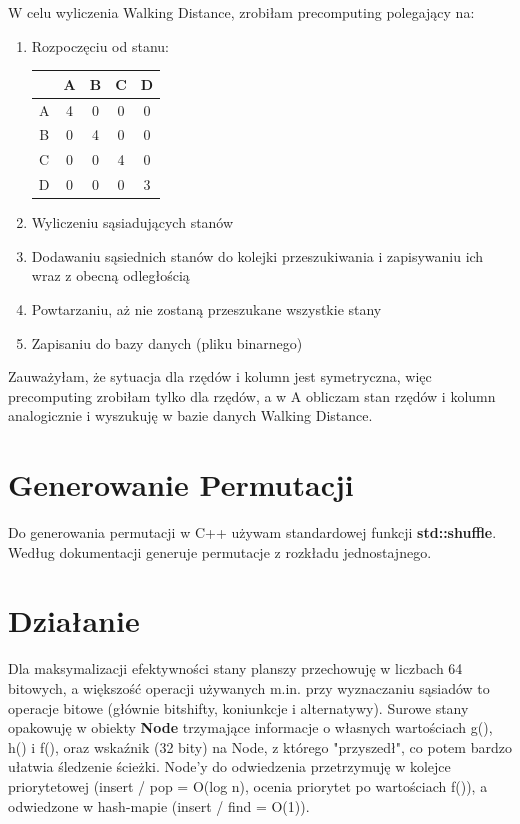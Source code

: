 \documentclass[12pt]{article}
\begin{document}
W celu wyliczenia Walking Distance, zrobiłam precomputing polegający na:
\begin{enumerate}
    \item Rozpoczęciu od stanu:
        \begin{tabular}{|c|c|c|c|c|}
        \hline
         & A & B & C & D \\
        \hline
        A & 4 & 0 & 0 & 0 \\
        \hline
        B & 0 & 4 & 0 & 0 \\
        \hline
        C & 0 & 0 & 4 & 0 \\
        \hline
        D & 0 & 0 & 0 & 3 \\
        \hline
        \end{tabular}
    \item Wyliczeniu sąsiadujących stanów
    \item Dodawaniu sąsiednich stanów do kolejki przeszukiwania i zapisywaniu ich wraz z obecną odległością
    \item Powtarzaniu, aż nie zostaną przeszukane wszystkie stany
    \item Zapisaniu do bazy danych (pliku binarnego)
\end{enumerate}
Zauważyłam, że sytuacja dla rzędów i kolumn jest symetryczna, więc precomputing zrobiłam tylko dla rzędów, a w A\* obliczam stan 
rzędów i kolumn analogicznie i wyszukuję w bazie danych Walking Distance.

\section{Generowanie Permutacji}

Do generowania permutacji w C++ używam standardowej funkcji \textbf{std::shuffle}. Według dokumentacji generuje permutacje 
z rozkładu jednostajnego.

\section{Działanie}

Dla maksymalizacji efektywności stany planszy przechowuję w liczbach 64 bitowych, a większość operacji używanych m.in. przy wyznaczaniu 
sąsiadów to operacje bitowe (głównie bitshifty, koniunkcje i alternatywy). Surowe stany opakowuję w obiekty \textbf{Node} trzymające informacje 
o własnych wartościach g(), h() i f(), oraz wskaźnik (32 bity) na Node, z którego "przyszedł", co potem bardzo ułatwia śledzenie ścieżki. 
Node'y do odwiedzenia przetrzymuję w kolejce priorytetowej (insert / pop = O(log n), ocenia priorytet po wartościach f()), a odwiedzone 
w hash-mapie (insert / find = O(1)).
\end{document}
